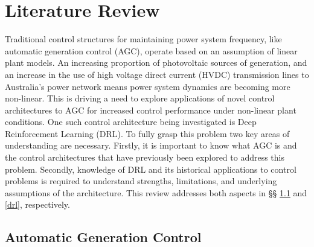 \section{Literature Review}

Traditional control structures for maintaining power system frequency, like automatic generation control (AGC), operate based on an assumption of linear plant models. An increasing proportion of photovoltaic sources of generation, and an increase in the use of high voltage direct current (HVDC) transmission lines to Australia's power network means power system dynamics are becoming more non-linear. This is driving a need to explore applications of novel control architectures to AGC for increased control performance under non-linear plant conditions. One such control architecture being investigated is Deep Reinforcement Learning (DRL). To fully grasp this problem two key areas of understanding are necessary. Firstly, it is important to know what AGC is and the control architectures that have previously been explored to address this problem. Secondly, knowledge of DRL and its historical applications to control problems is required to understand strengths, limitations, and underlying assumptions of the architecture. This review addresses both aspects in \S{}\S{} \ref{agc} and \ref{drl}, respectively.


\subsection{Automatic Generation Control}\label{agc}



